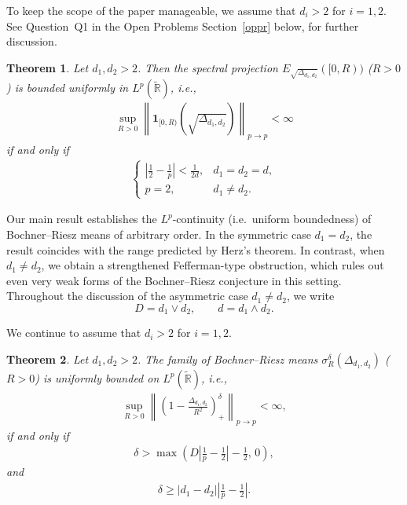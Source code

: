 \documentclass[12pt]{amsart}
\newcommand\R{\mathbb{R}}
\newcommand\Lapd{\Delta_{d_1, d_2}}
\newtheorem{theorem}{Theorem}[section]
\begin{document}

To keep the scope of the paper manageable, we assume that \(d_i>2\) for \(i=1,2\). See Question~Q1 in the Open Problems Section~\ref{oppr} below, for further discussion.


\begin{theorem}\label{main_spectral_projection}
Let $d_1,d_2>2$. Then the spectral projection $E_{\sqrt{\Lapd}}([0,R))$ ($R>0$) is bounded uniformly in $L^p(\widetilde{\R})$, i.e.,
\begin{align*}
    \sup_{R>0} \left\|  \mathbf{1}_{[0,R)}\left(\sqrt{\Lapd}\right)   \right\|_{p\to p} < \infty
\end{align*}
if and only if 
\begin{align*}
    \begin{cases}
        \left|\frac{1}{2}-\frac{1}{p}\right|<\frac{1}{2d}, & d_1=d_2=d,\\
        p=2, & d_1\ne d_2.
    \end{cases}
\end{align*}
\end{theorem}




Our main result establishes the $L^p$-continuity (i.e.\ uniform boundedness) of Bochner--Riesz means of arbitrary order. In the symmetric case $d_1=d_2$, the result coincides with the range predicted by Herz's theorem. In contrast, when $d_1\neq d_2$, we obtain a strengthened Fefferman-type obstruction, which rules out even very weak forms of the Bochner--Riesz conjecture in this setting.
Throughout the discussion of the asymmetric case $d_1\neq d_2$, we write
\[
D=d_1\vee d_2,\qquad d=d_1\wedge d_2.
\]


We continue to assume that \(d_i>2\) for \(i=1,2\).



\begin{theorem}\label{main_BR}
Let $d_1,d_2>2$. The family of Bochner--Riesz means $\sigma_{R}^\delta(\Lapd)$ ($R>0$) is uniformly bounded on $L^p(\widetilde{\R})$, i.e.,
\begin{align*}
    \sup_{R>0} \left\| \left( 1 - \frac{\Lapd}{R^2} \right)_+^{\delta}  \right\|_{p\to p} < \infty,
\end{align*}
if and only if
\begin{align*}
    \delta > \max \left( D\left|\frac{1}{p}-\frac{1}{2}\right|-\frac{1}{2},\, 0 \right),
\end{align*}
and
\begin{align}\label{asym}
    \delta \ge |d_1-d_2| \left|\frac{1}{p}-\frac{1}{2}\right|.
\end{align}
\end{theorem}
\end{document}
